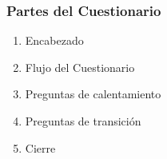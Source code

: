 \documentclass{article}
\begin{document}
        \subsubsection{Partes del Cuestionario}
            \begin{multicols}{2}
                \begin{enumerate}[label=\arabic*.]
                \item Encabezado
                \item Flujo del Cuestionario
                \item Preguntas de calentamiento
                \item Preguntas de transición
                \item Cierre
                \end{enumerate}
            \end{multicols}
\end{document}
